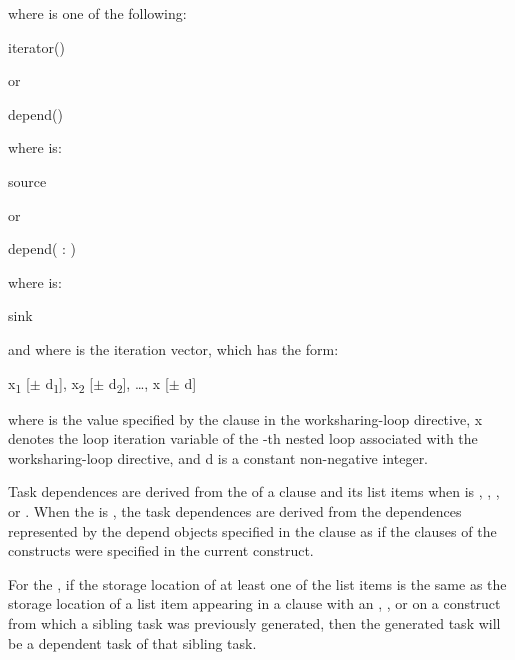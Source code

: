 where  is one of the following:
\begin{indentedcodelist}
iterator() 
\end{indentedcodelist}

or

\begin{ompSyntax}
depend()
\end{ompSyntax}

where  is:
\begin{indentedcodelist}
source
\end{indentedcodelist}

or

\begin{ompSyntax}
depend( : )
\end{ompSyntax}

where  is:
\begin{indentedcodelist}
sink
\end{indentedcodelist}

and where  is the iteration vector, which has the form:

x\textsubscript{1} [$\pm $ d\textsubscript{1}], x\textsubscript{2} [$\pm $ d\textsubscript{2}], \ldots, x\textsubscript{} [$\pm $ d\textsubscript{}]

where  is the value specified by the  clause in the 
worksharing-loop directive, x\textsubscript{} denotes the loop 
iteration variable of the -th nested loop associated with the 
worksharing-loop directive, and d\textsubscript{} is a constant 
non-negative integer.

\descr
Task dependences are derived from the  of a  
clause and its list items when  is , , 
, or . When the  is 
, the task dependences are derived from the dependences represented 
by the depend objects specified in the  clause as if the  
clauses of the  constructs were specified in the current construct. 

For the  , if the storage location of at least one
of the list items is the same as the storage location of a list item appearing
in a  clause with an , , or  
 on a construct from which a sibling task was previously 
generated, then the generated task will be a dependent task of that sibling task.

